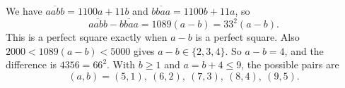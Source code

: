 We have $\overline{aabb}=1100a+11b$ and $\overline{bbaa}=1100b+11a$, so
\[
\overline{aabb}-\overline{bbaa}=1089(a-b)=33^2(a-b).
\]
This is a perfect square exactly when $a-b$ is a perfect square. Also $2000<1089(a-b)<5000$ gives $a-b\in\{2,3,4\}$. So $a-b=4$, and the difference is $4356=66^2$. With $b\ge1$ and $a=b+4\le9$, the possible pairs are
\[
\boxed{(a,b)=(5,1),\ (6,2),\ (7,3),\ (8,4),\ (9,5)}.
\]
